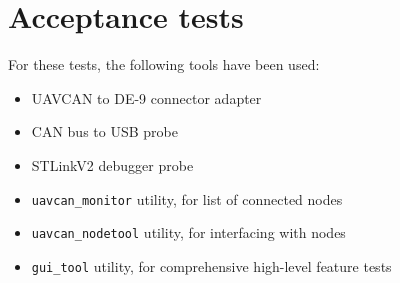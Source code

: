 \section{Acceptance tests}\label{sec:test_trace}
For these tests, the following tools have been used:
\begin{itemize}
    \item UAVCAN to DE-9 connector adapter
    \item CAN bus to USB probe
    \item STLinkV2 debugger probe
    \item \texttt{uavcan\_monitor} utility, for list of connected nodes
    \item \texttt{uavcan\_nodetool} utility, for interfacing with nodes
    \item \texttt{gui\_tool} utility, for comprehensive high-level feature tests
\end{itemize}

